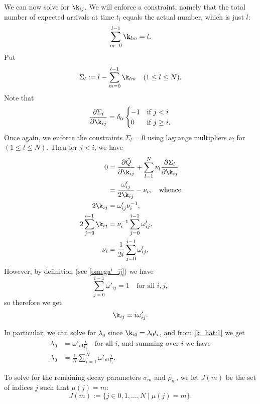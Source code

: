 \documentclass[12pt,leqno]{article}
\begin{document}
We can now solve for $\k_{ij}$.  We will enforce a constraint, namely that
the total number of expected arrivals at time $t_l$ equals the actual number, which is just $l$:
$$
\sum_{m=0}^{l-1}\k_{lm} = l.
$$
Put
$$
\Sigma_l:= l - \sum_{m=0}^{l-1}\k_{lm} \quad(1\le l \le N).
$$
Note that
$$
\frac{\partial\Sigma_l}{\partial\k_{ij}} = \delta_{li}\begin{cases}
  -1 & \text{if $j < i$ } \\
  0 & \text{if $j \ge i$}.
\end{cases}
$$
Once again, we enforce the constraints $\Sigma_l = 0$  using lagrange multipliers $\nu_l$ for $(1\le l\le N)$.
Then for $ j < i$, we have
\begin{equation}
  \begin{split}
    0 &= \frac{\partial\tilde{Q}}{\partial\k_{ij}} + \sum_{l=1}^N\nu_l\frac{\partial\Sigma_l}{\partial\k_{ij}} \\
    &= \frac{\omega'_{ij}}{2\k_{ij}} - \nu_i,\quad\text{whence}\\
    2\k_{ij}  &= \omega'_{ij}\nu_i^{-1},\\
    2\sum_{j=0}^{i-1}\k_{ij} &= \nu_i^{-1}\sum_{j=0}^{i-1}\omega'_{ij},\\
    \nu_i &= \frac{1}{2i}\sum_{j=0}^{i-1}\omega'_{ij},\\
  \end{split}
\end{equation}
However, by definition (see \eqref{omega'_ij}) we have
$$
\sum_{j=0}^{i-1}\omega'_{ij} = 1\quad\text{for all $i,j$},
$$
so therefore we get
\begin{equation}\label{k_hat:1}
  \k_{ij} = i\omega'_{ij}.
\end{equation}

In particular, we can solve for $\lambda_0$ since $\k_{i0} = \lambda_0t_i$, and from \eqref{k_hat:1}
we get
\begin{equation}\label{lambda_0}
  \begin{split}
\lambda_0 &= \omega'_{i0}\frac{i}{t_i} \quad\text{for all $i$, and summing over $i$ we have}\\
\lambda_0 &= \frac{1}{N}\sum_{i=1}^N\omega'_{i0}\frac{i}{t_i}.
  \end{split}
\end{equation}

To solve for the remaining decay parameters $\sigma_m$ and $\rho_m$, 
we let $J(m)$ be the set of indices $j$ such that $\mu(j) = m$:
$$
J(m) := \{j\in 0,1,\dots,N \mid \mu(j) = m\}.
$$
\end{document}
